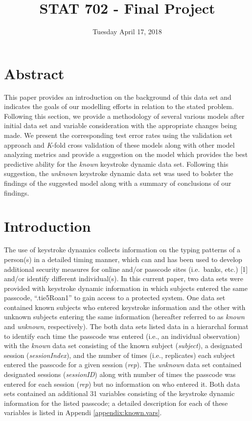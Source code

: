 \documentclass[]{article}
\title{STAT 702 - Final Project}
\author{}
\date{Tuesday April 17, 2018}
\begin{document}
\maketitle

{
\setcounter{tocdepth}{2}
\tableofcontents
}
\allowdisplaybreaks
\newpage

\section{Abstract}\label{abstract}

This paper provides an introduction on the background of this data set
and indicates the goals of our modelling efforts in relation to the
stated problem. Following this section, we provide a methodology of
several various models after initial data set and variable consideration
with the appropriate changes being made. We present the corresponding
test error rates using the validation set approach and \emph{K}-fold
cross validation of these models along with other model analyzing
metrics and provide a suggestion on the model which provides the best
predictive ability for the \emph{known} keystroke dynamic data set.
Following this suggestion, the \emph{unknown} keystroke dynamic data set
was used to bolster the findings of the suggested model along with a
summary of conclusions of our findings.

\section{Introduction}\label{introduction}

The use of keystroke dynamics collects information on the typing
patterns of a person(s) in a detailed timing manner, which can and has
been used to develop additional security measures for online and/or
passcode sites (i.e.~banks, etc.) {[}1{]} and/or identify different
individual(s). In this current paper, two data sets were provided with
keystroke dynamic information in which subjects entered the same
passcode, ``.tie5Roan1'' to gain access to a protected system. One data
set contained known subjects who entered keystroke information and the
other with unknown subjects entering the same information (hereafter
referred to as \emph{known} and \emph{unknown}, respectively). The both
data sets listed data in a hierarchal format to identify each time the
passcode was entered (i.e., an individual observation) with the
\emph{known} data set consisting of the known subject (\emph{subject}),
a designated session (\emph{sessionIndex}), and the number of times
(i.e., replicates) each subject entered the passcode for a given session
(\emph{rep}). The \emph{unknown} data set contained designated sessions
(\emph{sessionID}) along with number of times the passcode was entered
for each session (\emph{rep}) but no information on who entered it. Both
data sets contained an additional 31 variables consisting of the
keystroke dynamic information for the listed passcode; a detailed
description for each of these variables is listed in Appendi
\ref{appendix:known.vars}.
\end{document}
